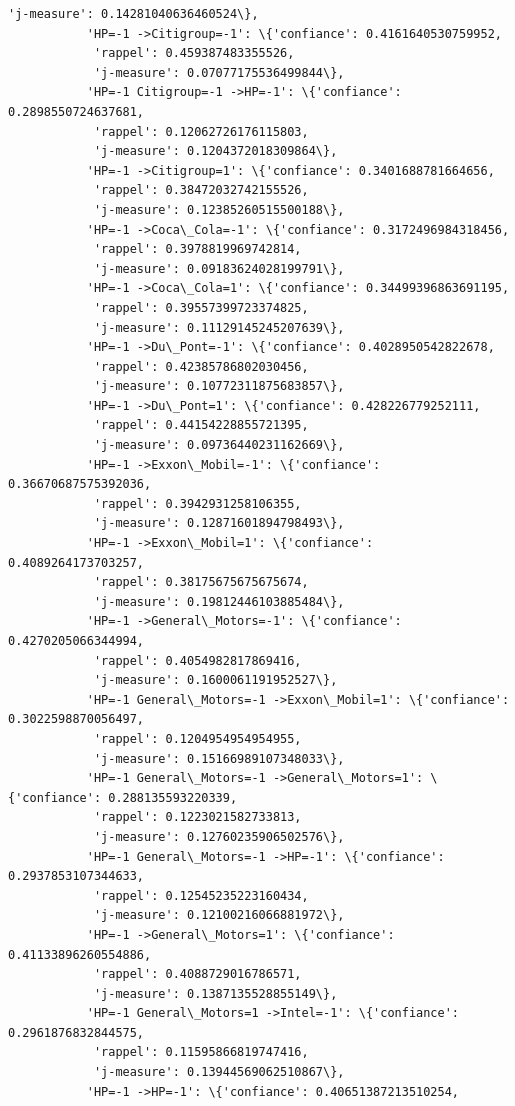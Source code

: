 \documentclass[11pt]{article}
\begin{document}
\begin{Verbatim}[commandchars=\\\{\}]
            'j-measure': 0.14281040636460524\},
           'HP=-1 ->Citigroup=-1': \{'confiance': 0.4161640530759952,
            'rappel': 0.459387483355526,
            'j-measure': 0.07077175536499844\},
           'HP=-1 Citigroup=-1 ->HP=-1': \{'confiance': 0.2898550724637681,
            'rappel': 0.12062726176115803,
            'j-measure': 0.1204372018309864\},
           'HP=-1 ->Citigroup=1': \{'confiance': 0.3401688781664656,
            'rappel': 0.38472032742155526,
            'j-measure': 0.12385260515500188\},
           'HP=-1 ->Coca\_Cola=-1': \{'confiance': 0.3172496984318456,
            'rappel': 0.3978819969742814,
            'j-measure': 0.09183624028199791\},
           'HP=-1 ->Coca\_Cola=1': \{'confiance': 0.34499396863691195,
            'rappel': 0.39557399723374825,
            'j-measure': 0.11129145245207639\},
           'HP=-1 ->Du\_Pont=-1': \{'confiance': 0.4028950542822678,
            'rappel': 0.42385786802030456,
            'j-measure': 0.10772311875683857\},
           'HP=-1 ->Du\_Pont=1': \{'confiance': 0.428226779252111,
            'rappel': 0.44154228855721395,
            'j-measure': 0.09736440231162669\},
           'HP=-1 ->Exxon\_Mobil=-1': \{'confiance': 0.36670687575392036,
            'rappel': 0.3942931258106355,
            'j-measure': 0.12871601894798493\},
           'HP=-1 ->Exxon\_Mobil=1': \{'confiance': 0.4089264173703257,
            'rappel': 0.38175675675675674,
            'j-measure': 0.19812446103885484\},
           'HP=-1 ->General\_Motors=-1': \{'confiance': 0.4270205066344994,
            'rappel': 0.4054982817869416,
            'j-measure': 0.1600061191952527\},
           'HP=-1 General\_Motors=-1 ->Exxon\_Mobil=1': \{'confiance': 0.3022598870056497,
            'rappel': 0.1204954954954955,
            'j-measure': 0.15166989107348033\},
           'HP=-1 General\_Motors=-1 ->General\_Motors=1': \{'confiance': 0.288135593220339,
            'rappel': 0.1223021582733813,
            'j-measure': 0.12760235906502576\},
           'HP=-1 General\_Motors=-1 ->HP=-1': \{'confiance': 0.2937853107344633,
            'rappel': 0.12545235223160434,
            'j-measure': 0.12100216066881972\},
           'HP=-1 ->General\_Motors=1': \{'confiance': 0.41133896260554886,
            'rappel': 0.4088729016786571,
            'j-measure': 0.1387135528855149\},
           'HP=-1 General\_Motors=1 ->Intel=-1': \{'confiance': 0.2961876832844575,
            'rappel': 0.11595866819747416,
            'j-measure': 0.13944569062510867\},
           'HP=-1 ->HP=-1': \{'confiance': 0.40651387213510254,

\end{Verbatim}
\end{document}
